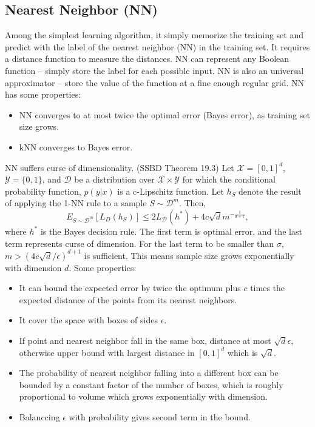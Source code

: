 \documentclass{article}
\begin{document}
   \subsection{Nearest Neighbor (NN)}
   Among the simplest learning algorithm, it simply memorize the training set and predict with the label of the nearest neighbor (NN) in the training set. It requires a distance function to measure the distances. NN can represent any Boolean function -- simply store the label for each possible input. NN is also an universal approximator -- store the value of the function at a fine enough regular grid. NN has some properties:
   \begin{itemize}
   \item NN converges to at most twice the optimal error (Bayes error), as training set size grows.
   \item kNN converges to Bayes error.
   \end{itemize}
   NN suffers curse of dimensionality. (SSBD Theorem 19.3) Let $\mathcal{X}=[0, 1]^d$, $\mathcal{Y} = \{0, 1\}$, and $\mathcal{D}$ be a distribution over $\mathcal{X \times Y}$ for which the conditional probability function, $p(y|x)$ is a c-Lipschitz function. Let $h_S$ denote the result of applying the 1-NN rule to a sample $S \sim \mathcal{D}^m$. Then, 
   \begin{equation}
   E_{S \sim \mathcal{D}^m} [L_D(h_S)] \leq 2L_\mathcal{D}(h^*) + 4c\sqrt{d}m^{-\frac{1}{d+1}},
   \end{equation}
   where $h^*$ is the Bayes decision rule. The first term is optimal error, and the last term represents curse of dimension. For the last term to be smaller than $\sigma$, $m > (4c\sqrt{d}/\epsilon)^{d+1}$ is sufficient. This means sample size grows exponentially with dimension $d$. Some properties:
   \begin{itemize}
   \item It can bound the expected error by twice the optimum plus $c$ times the expected distance of the points from its nearest neighbors.
   \item It cover the space with boxes of sides $\epsilon$.
   \item If point and nearest neighbor fall in the same box, distance at most $\sqrt{d}\epsilon$, otherwise upper bound with largest distance in $[0,1]^d$ which is $\sqrt{d}$.
   \item The probability of nearest neighbor falling into a different box can be bounded by a constant factor of the number of boxes, which is roughly proportional to volume which grows exponentially with dimension.
   \item Balanccing $\epsilon$ with probability gives second term in the bound. 
   \end{itemize}
\end{document}
